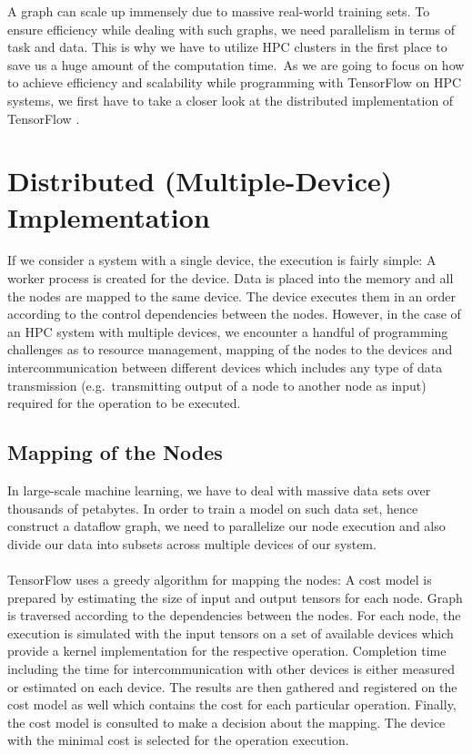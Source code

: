 \documentclass[ieeetran]{article}
\begin{document}
\addtocounter{footnote}{-2}

\hspace{-0.51cm}A graph can scale up immensely due to massive real-world training sets. To ensure efficiency while dealing with such graphs, we need parallelism in terms of task and data. This is why we have to utilize HPC clusters in the first place to save us a huge amount of the computation time.\ As we are going to focus on how to achieve efficiency and scalability while programming with TensorFlow on HPC systems, we first have to take a closer look at the distributed implementation of TensorFlow \cite{first}.


\section{Distributed (Multiple-Device) Implementation} %
\label{sec:multiple_device_execution_of_a_graph}
If we consider a system with a single device, the execution is fairly simple: A worker process is created for the device. Data is placed into the memory and all the nodes are mapped to the same device. The device executes them in an order according to the control dependencies between the nodes. However, in the case of an HPC system with multiple devices, we encounter a handful of programming challenges as to resource management, mapping of the nodes to the devices and intercommunication between different devices which includes any type of data transmission (e.g.\ transmitting output of a node to another node as input) required for the operation to be executed.

\subsection{Mapping of the Nodes} %
\label{sub:mapping_of_nodes}
In large-scale machine learning, we have to deal with massive data sets over thousands of petabytes. In order to train a model on such data set, hence construct a dataflow graph, we need to parallelize our node execution and also divide our data into subsets across multiple devices of our system. 
\\ \\TensorFlow uses a greedy algorithm for mapping the nodes: A cost model is prepared by estimating the size of input and output tensors for each node. Graph is traversed according to the dependencies between the nodes. For each node, the execution is simulated with the input tensors on a set of available devices which provide a kernel implementation for the respective operation. Completion time including the time for intercommunication with other devices is either measured or estimated on each device. The results are then gathered and registered on the cost model as well which contains the cost for each particular operation. Finally, the cost model is consulted to make a decision about the mapping. The device with the minimal cost is selected for the operation execution.
\end{document}
